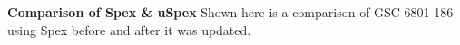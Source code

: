 {\bf Comparison of Spex \& uSpex} Shown here is a comparison of GSC 6801-186 using Spex before and after it was updated.
